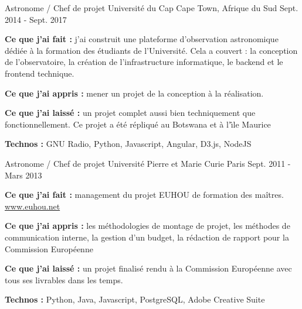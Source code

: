 \begin{cventries}
  \cventry
    {Astronome / Chef de projet} %
    {Université du Cap} %
    {Cape Town, Afrique du Sud} %
    {Sept. 2014 - Sept. 2017} %
    {
      \begin{cvitems} %
        \item {\textbf{Ce que j'ai fait :} j'ai construit une plateforme d'observation astronomique dédiée à la formation des étudiants de l'Université. Cela a couvert : la conception de l'observatoire, la création de l'infrastructure informatique, le backend et le frontend technique.}
        \item {\textbf{Ce que j'ai appris :} mener un projet de la conception à la réalisation.}
        \item {\textbf{Ce que j'ai laissé :} un projet complet aussi bien techniquement que fonctionnellement. Ce projet a été répliqué au Botswana et à l'\^\i le Maurice}
        \item {\textbf{Technos :} GNU Radio, Python, Javascript, Angular, D3.js, NodeJS}
      \end{cvitems}
    }

  \cventry
    {Astronome / Chef de projet} %
    {Université Pierre et Marie Curie} %
    {Paris} %
    {Sept. 2011 - Mars 2013} %
    {
      \begin{cvitems} %
        \item {\textbf{Ce que j'ai fait :} management du projet EUHOU de formation des maîtres. \url{www.euhou.net}}
        \item {\textbf{Ce que j'ai appris :} les méthodologies de montage de projet, les méthodes de communication interne, la gestion d'un budget, la rédaction de rapport pour la Commission Européenne}
        \item {\textbf{Ce que j'ai laissé :} un projet finalisé rendu à la Commission Européenne avec tous ses livrables dans les temps. }
        \item {\textbf{Technos :} Python, Java, Javascript, PostgreSQL, Adobe Creative Suite}
      \end{cvitems}
    }


\end{cventries}
